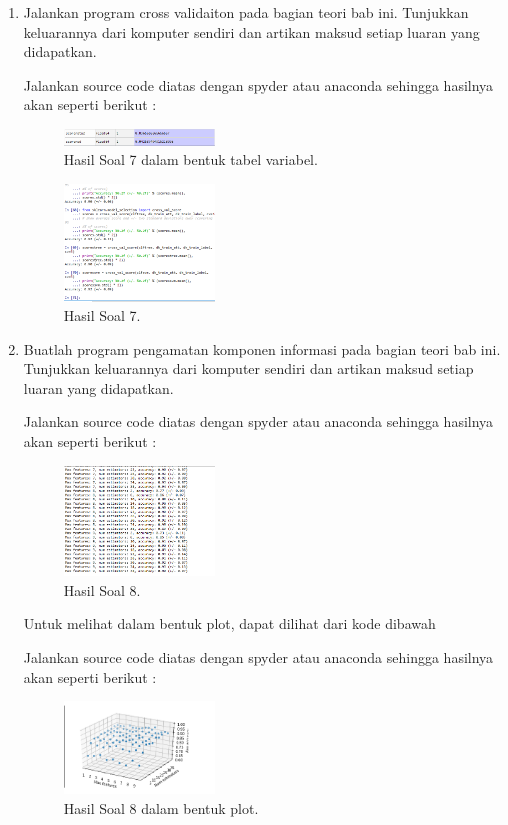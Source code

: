 \begin{enumerate}
    \item Jalankan program cross validaiton pada bagian teori bab ini. Tunjukkan keluarannya dari komputer sendiri dan artikan maksud setiap luaran yang didapatkan.
	\hfill\break
    
	Jalankan source code diatas dengan spyder atau anaconda sehingga hasilnya akan seperti berikut : 
	\begin{figure}[H]
	\centering
		\includegraphics[width=4cm]{figures/1174096/tugas4/hasil7-1.PNG}
		\caption{Hasil Soal 7 dalam bentuk tabel variabel.}
	\end{figure}
    \begin{figure}[H]
	\centering
		\includegraphics[width=4cm]{figures/1174096/tugas4/hasil7-2.PNG}
		\caption{Hasil Soal 7.}
	\end{figure}


    \item Buatlah program pengamatan komponen informasi pada bagian teori bab ini. Tunjukkan keluarannya dari komputer sendiri dan artikan maksud setiap luaran yang didapatkan.
	\hfill\break
    
	Jalankan source code diatas dengan spyder atau anaconda sehingga hasilnya akan seperti berikut : 
	\begin{figure}[H]
	\centering
		\includegraphics[width=4cm]{figures/1174096/tugas4/hasil8-1.PNG}
		\caption{Hasil Soal 8.}
	\end{figure}
    Untuk melihat dalam bentuk plot, dapat dilihat dari kode dibawah
    
	Jalankan source code diatas dengan spyder atau anaconda sehingga hasilnya akan seperti berikut : 
    \begin{figure}[H]
	\centering
		\includegraphics[width=4cm]{figures/1174096/tugas4/hasil8-2.PNG}
		\caption{Hasil Soal 8 dalam bentuk plot.}
	\end{figure}
\end{enumerate}

